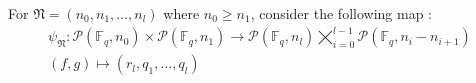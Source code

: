 
For $\mathfrak{N} = (n_0, n_1,\ldots, n_l)$ where $n_0\geq n_1$, consider the following map :
\begin{gather*}
    \psi_{\mathfrak{N}} : \mathscr{P}(\mathbb{F}_q, n_0)\times\mathscr{P}(\mathbb{F}_q, n_1) \to \mathscr{P}(\mathbb{F}_q, n_l)\bigtimes_{i=0}^{l-1} \mathscr{P}(\mathbb{F}_q, n_i-n_{i+1}) \\
    (f,g) \mapsto (r_l, q_1, \ldots, q_l)
\end{gather*}
